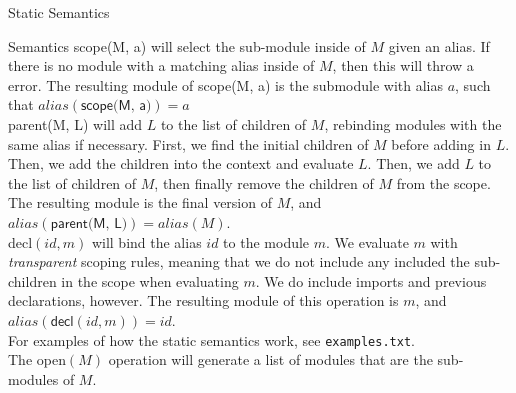 \documentclass[11pt]{article}
\begin{document}
\begin{section}{Static Semantics}
\begin{subsection}{Semantics}
\textsf{scope(M, a)} will select the sub-module inside of $M$ given an alias. If there is no module with a matching alias inside of $M$, then this will throw a error. The resulting module of \textsf{scope(M, a)} is the submodule with alias $a$, such that $alias(\textsf{scope(M, a)}) = a$\\

\textsf{parent(M, L)} will add $L$ to the list of children of $M$, rebinding modules with the same alias if necessary. First, we find the initial children of $M$ before adding in $L$. Then, we add the children into the context and evaluate $L$. Then, we add $L$ to the list of children of $M$, then finally remove the children of $M$ from the scope. The resulting module is the final version of $M$, and $alias(\textsf{parent(M, L)}) = alias(M)$. \\

\textsf{decl}$(id, m)$ will bind the alias $id$ to the module $m$. We evaluate $m$ with \emph{transparent} scoping rules, meaning that we do not include any included the sub-children in the scope when evaluating $m$. We do include imports and previous declarations, however. The resulting module of this operation is $m$, and $alias(\textsf{decl}(id, m)) = id$. \\

For examples of how the static semantics work, see \verb|examples.txt|.\\

The \textsf{open}$(M)$ operation will generate a list of modules that are the sub-modules of $M$. 

\begin{comment}
Since we're dealing with classes in java, a type might have many super types because of inheritance. We write $\tau <: \tau'$ when the class $\tau$ is a subtype of, or extends the class $\tau'$. We define the type \textbf{Ty} to describe java classes, such that $\tau \in \textbf{Ty}$ if and only if $\tau <: \verb|Module|$.\\

We define the type $\textbf{Ns} = \emph{javaRef} \rightharpoonup \textbf{Ty}$ to define our namespace. The  partial function $\Gamma : \textbf{Ns}$ to express a namespace from a java reference to a java module class. Classically $\Gamma \vdash x : \tau\;\emph{valid}$ is written to express that expression $x$  has type $\tau$ under the context $\Gamma$. Here, we will write $(x, \tau) \in \Gamma$ as an equivalent expression.\\


\end{comment}
\end{subsection}
\end{section}
\end{document}
